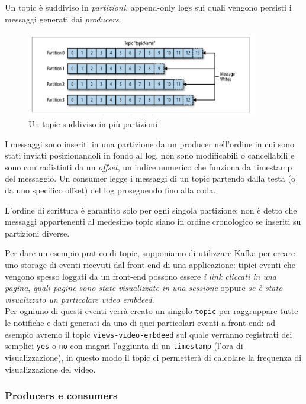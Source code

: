 \documentclass[]{article}
\begin{document}
Un topic è suddiviso in \emph{partizioni}, append-only logs sui quali
vengono persisti i messaggi generati dai \emph{producers}.

\begin{figure}
\centering
\includegraphics[width=0.90000\textwidth]{../images/topic-and-partitions.png}
\caption{Un topic suddiviso in più partizioni \label{figure_3}}
\end{figure}

I messaggi sono inseriti in una partizione da un producer nell'ordine in
cui sono stati inviati posizionandoli in fondo al log, non sono
modificabili o cancellabili e sono contradistinti da un \emph{offset},
un indice numerico che funziona da timestamp del messaggio. Un consumer
legge i messaggi di un topic partendo dalla testa (o da uno specifico
offset) del log proseguendo fino alla coda.

L'ordine di scrittura è garantito solo per ogni singola partizione: non
è detto che messaggi appartenenti al medesimo topic siano in ordine
cronologico se inseriti su partizioni diverse.

Per dare un esempio pratico di topic, supponiamo di utilizzare Kafka per
creare uno storage di eventi ricevuti dal front-end di una applicazione:
tipici eventi che vengono spesso loggati da un front-end possono essere
\emph{i link cliccati in una pagina}, \emph{quali pagine sono state
visualizzate in una sessione} oppure \emph{se è stato visualizzato un
particolare video embdeed}.\\
Per ogniuno di questi eventi verrà creato un singolo \texttt{topic} per
raggruppare tutte le notifiche e dati generati da uno di quei
particolari eventi a front-end: ad esempio avremo il topic
\texttt{views-video-embdeed} sul quale verranno registrati dei semplici
\texttt{yes} o \texttt{no} con magari l'aggiunta di un
\texttt{timestamp} (l'ora di visualizzazione), in questo modo il topic
ci permetterà di calcolare la frequenza di visualizzazione del video.

\newpage

\subsubsection{Producers e consumers}\label{producers-e-consumers}
\end{document}
